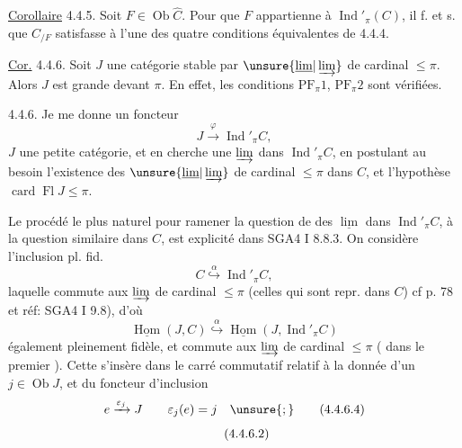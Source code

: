 
\uline{Corollaire} 4.4.5. Soit $F\in\operatorname{Ob}\widehat C$. Pour que $F$ appartienne à $\operatorname{Ind}'_{\pi}(C)$, il f. et s. que $C_{/F}$ satisfasse à l'une des quatre conditions équivalentes de 4.4.4.
\margin{$\big|$}

\uline{Cor.} 4.4.6. Soit $J$ une catégorie stable par $\unsure{\underline{\lim}|\varinjlim}$ de  cardinal $\leq\pi$. Alors $J$ est grande devant $\pi$. En effet, les conditions $\mathrm{PF}_{\pi}1$, $\mathrm{PF}_{\pi}2$ sont  vérifiées.

4.4.6. Je me donne un foncteur
\[
J\xrightarrow{\varphi}\operatorname{Ind}'_{\pi}C,\tag*{(4.4.6.1)}
\]
$J$ une petite catégorie, et en cherche une $\varinjlim$ dans $\operatorname{Ind}'_{\pi}C$, en postulant au besoin l'existence des $\unsure{\underline{\lim}|\varinjlim}$ de cardinal $\leq\pi$ dans $C$, et l'hypothèse $\operatorname{card}\operatorname{Fl}J\leq\pi$.

Le procédé le plus naturel pour ramener la question de  des $\underline{\lim}$ dans $\operatorname{Ind}'_{\pi}C$, à la question similaire dans $C$, est explicité dans SGA4 I 8.8.3. On considère l'inclusion pl. fid.
\[
C\overset{\alpha}{\hookrightarrow}\operatorname{Ind}'_{\pi}C,\tag*{(4.4.6.2)}
\]
laquelle commute aux $\varinjlim$ de cardinal $\leq\pi$ (celles qui sont repr. dans $C$) cf p. 78 et réf: SGA4 I 9.8), d'où
\[
\underline{\operatorname{Hom}}(J,C)\overset{\alpha}{\hookrightarrow}\underline{\operatorname{Hom}}(J,\operatorname{Ind}'_{\pi}C)\tag*{(4.4.6.3)}
\]
également pleinement fidèle, et commute aux $\varinjlim$ de cardinal $\leq\pi$ ( dans le premier ). Cette  s'insère dans le carré commutatif relatif à la donnée d'un $j\in\operatorname{Ob}J$, et du foncteur d'inclusion
\[
e\xrightarrow{\varepsilon_j}J\qquad\varepsilon_j(e)=j\quad\unsure{;}\tag*{(4.4.6.4)}
\]
\[\tag*{(4.4.6.2)}\vphantom{C}\]

